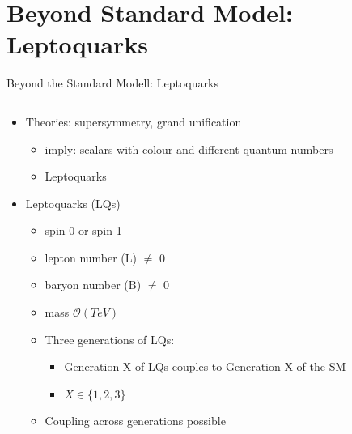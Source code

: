 \section{Beyond Standard Model: Leptoquarks}
\frame{\tableofcontents[currentsection]}
\begin{frame}{Beyond the Standard Modell: Leptoquarks}
    \begin{columns}
        \begin{column}{0.55\textwidth}
            \begin{itemize}
                \item Theories: supersymmetry, grand unification
                \begin{itemize}
                    \item imply: scalars with colour and different quantum numbers
                    \item [\rightarrow] Leptoquarks
                \end{itemize}
            \end{itemize}
            \begin{itemize}
                \item Leptoquarks (LQs)
                    \begin{itemize}
                        \item spin 0 or spin 1
                        \item lepton number (L) $\neq$ 0
                        \item baryon number (B) $\neq$ 0
                        \item mass $\mathcal{O}\left( TeV \right)$
                        \item Three generations of LQs:
                        \begin{itemize}
                            \item Generation X of LQs couples to Generation X of the SM
                            \item [] $X \in \{1, 2, 3 \}$
                        \end{itemize}
                        \item Coupling across generations possible
                    \end{itemize}
            \end{itemize}
        \end{column}
        \begin{column}{0.45\textwidth}
            \begin{itemize}

\end{itemize}
\end{column}
\end{columns}
\end{frame}
